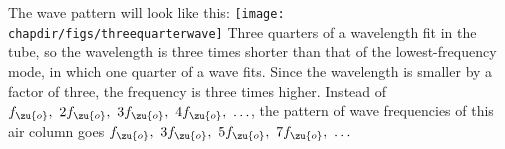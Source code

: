 The wave pattern will look like this:
\texttt{[image: \\chapdir/figs/threequarterwave]} Three quarters of a
wavelength fit in the tube, so the wavelength is three times shorter
than that of the lowest-frequency mode, in which one quarter of a
wave fits. Since the wavelength is smaller by a factor of three, the
frequency is three times higher. Instead of $f_\zu{o},\ 2f_\zu{o},\
3f_\zu{o},\ 4f_\zu{o},\ \ldots$, the pattern of wave frequencies of
this air column goes $f_\zu{o},\ 3f_\zu{o},\ 5f_\zu{o},\ 7f_\zu{o},\
\ldots$
